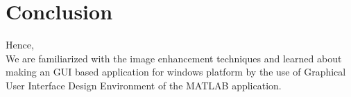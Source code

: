 \documentclass[12pt]{article}
\begin{document}
\pagebreak

\section{Conclusion}
Hence, \\
We are familiarized with the image enhancement techniques and learned about making an GUI based application for windows platform by the use of Graphical User Interface Design Environment of the MATLAB application.
\end{document}
